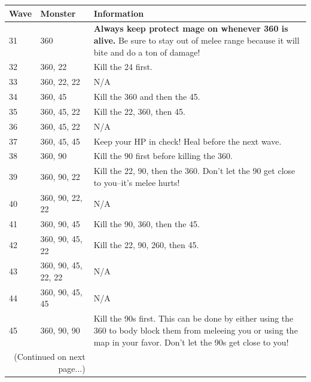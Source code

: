 \documentclass{article}
\begin{document}
\begin{table}[!htbt]
    \begin{tabular}{  l  p{3.4cm}  p{3.4cm} }
        \toprule
\textbf{Wave}      
& \textbf{Monster}   
& \textbf{Information} \\\midrule
31 & 360 & \textbf{Always keep protect mage on whenever 360 is alive.} Be sure to stay out of melee range because it will bite and do a ton of damage! \\\hline

32 & 360, 22 & Kill the 24 first. \\\hline

33 & 360, 22, 22 & N/A \\\hline

34 & 360, 45 & Kill the 360 and then the 45. \\\hline

35 & 360, 45, 22 & Kill the 22, 360, then 45. \\\hline

36 & 360, 45, 22 & N/A \\\hline

37 & 360, 45, 45 & Keep your HP in check! Heal before the next wave. \\\hline

38 & 360, 90 & Kill the 90 first before killing the 360. \\\hline

39 & 360, 90, 22 & Kill the 22, 90, then the 360. Don't let the 90 get close to you--it's melee hurts! \\\hline

40 & 360, 90, 22, 22 & N/A \\\hline

41 & 360, 90, 45 & Kill the 90, 360, then the 45. \\\hline

42 & 360, 90, 45, 22 & Kill the 22, 90, 260, then 45. \\\hline

43 & 360, 90, 45, 22, 22 & N/A \\\hline

44 & 360, 90, 45, 45 & N/A \\\hline

45 & 360, 90, 90 & Kill the 90s first. This can be done by either using the 360 to body block them from meleeing you or using the map in your favor. Don't let the 90s get close to you! \\\hline


      \bottomrule
        \multicolumn{2}{r}{\footnotesize(Continued on next page...)}
    \end{tabular}
\end{table}
\newpage
\end{document}
